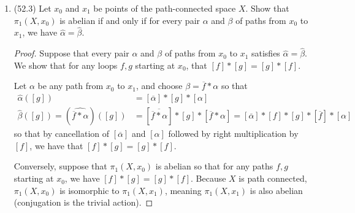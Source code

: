 \documentclass[11pt]{article}
\begin{document}
\begin{enumerate}
\begin{proof}
        Then for any $[f]\in \pi_1(X,x_0)$, we have $\hat{\gamma}([f]) = [\overline{\gamma}]\ast[f]\ast[\gamma] = [\overline{\beta}\ast \overline{\alpha}]\ast[f]\ast[\alpha\ast\beta]$ $= [\overline{\beta}]\ast([\overline{\alpha}]\ast[f]\ast[\alpha])\ast[\beta] = (\hat{\beta}\circ\hat{\alpha})([f])$ so that $\hat{\gamma} = \hat{\beta}\circ\hat{\alpha}$.
    \end{proof}
    \item (52.3) Let $x_0$ and $x_1$ be points of the path-connected space $X$. Show that $\pi_1(X,x_0)$ is abelian if and only if for every pair $\alpha$ and $\beta$ of paths from $x_0$ to $x_1$, we have $\hat{\alpha} = \hat{\beta}$.
    \begin{proof}
        Suppose that every pair $\alpha$ and $\beta$ of paths from $x_0$ to $x_1$ satisfies $\hat{\alpha} = \hat{\beta}$. We show that for any loops $f,g$ starting at $x_0$, that $[f]\ast [g] = [g]\ast [f]$.

        Let $\alpha$ be any path from $x_0$ to $x_1$, and choose $\beta = \overline{f}\ast \alpha$ so that \begin{align*}
            \hat{\alpha}([g]) &= [\overline{\alpha}]\ast [g]\ast [\alpha]\\
            \hat{\beta}([g]) = (\widehat{\overline{f}\ast \alpha})([g]) &= [\overline{\overline{f}\ast \alpha}]\ast [g]\ast [\overline{f}\ast \alpha] = [\overline{\alpha}]\ast[f]\ast[g]\ast[\overline{f}]\ast[\alpha]
        \end{align*}
        so that by cancellation of $[\overline{\alpha}]$ and $[\alpha]$ followed by right multiplication by $[f]$, we have that $[f]\ast [g] = [g]\ast [f]$.

        Conversely, suppose that $\pi_1(X,x_0)$ is abelian so that for any paths $f,g$ starting at $x_0$, we have $[f]\ast [g] = [g]\ast [f]$. Because $X$ is path connected, $\pi_1(X,x_0)$ is isomorphic to $\pi_1(X,x_1)$, meaning $\pi_1(X,x_1)$ is also abelian (conjugation is the trivial action).
        

\end{proof}
\end{enumerate}
\end{document}
